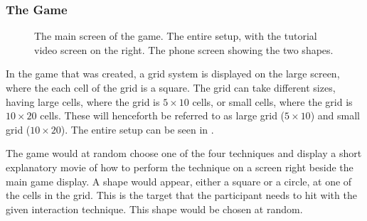 \subsubsection{The Game}

\begin{figure}[H]
	\caption{
		\protect{} The main screen of the game.
		\protect{} The entire setup, with the tutorial video screen on the right.
		\protect{} The phone screen showing the two shapes.
	}
	\label{fig:allSetup}
\end{figure}

In the game that was created, a grid system is displayed on the large screen, where the each cell of the grid is a square. 
The grid can take different sizes, having large cells, where the grid is $5 \times 10$ cells, or small cells, where the grid is $10 \times 20$ cells. 
These will henceforth be referred to as large grid ($5 \times 10$) and small grid ($10 \times 20$). The entire setup can be seen in .

The game would at random choose one of the four techniques and display a short explanatory movie of how to perform the technique on a screen right beside the main game display. 
A shape would appear, either a square or a circle, at one of the cells in the grid. 
This is the target that the participant needs to hit with the given interaction technique. 
This shape would be chosen at random. 

